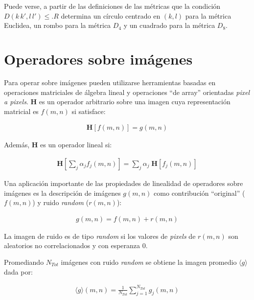 %
Puede verse, a partir de las definiciones de las m\'etricas que la condici\'on $D(k \, k', l \, l') \leq. R$ determina un c\'irculo centrado en $(k, l)$ 
para la m\'etrica Euclidea, un rombo para la m\'etrica $D_{4}$ y un cuadrado para la m\'etrica $D_{8}$.


\section{Operadores sobre im\'agenes}

Para operar sobre im\'agenes pueden utilizarse herramientas basadas en operaciones matriciales de \'algebra lineal y operaciones ``de array'' orientadas 
\textit{pixel a pixels}.
%
$\mathbf{H}$ es un operador arbitrario sobre una imagen cuya representaci\'on matricial es $f(m, n)$ si satisface:

\begin{eqnarray}
	\mathbf{H} \left[ f(m, n) \right] = g(m, n)
\label{EqXXXV}
\end{eqnarray}

Adem\'as, $\mathbf{H}$ es un operador lineal si:

\begin{eqnarray}
	\mathbf{H} \left[ \sum _{j} \alpha_{j} f_{j}(m, n) \right] = \sum _{j} \alpha_{j} \; \mathbf{H} \left[ f_{j}(m, n) \right]
\label{EqXXXVI}
\end{eqnarray}

Una aplicaci\'on importante de las propiedades de linealidad de operadores sobre im\'agenes es la descripci\'on de im\'agenes $g(m, n)$ como contribuci\'on 
``original'' ($f(m, n)$) y ruido \textit{random} ($r(m, n)$):

\begin{eqnarray}
	g(m, n) = f(m, n) + r(m, n)
\label{EqXXXVII}
\end{eqnarray}


La imagen de ruido es de tipo \textit{random} si los valores de \textit{pixels} de $r(m, n)$ son aleatorios no correlacionados y con esperanza 0.
%

%
Promediando $N_{Tot}$ im\'agenes con ruido \textit{random} se obtiene la imagen promedio $\langle g \rangle$ dada por:

\begin{eqnarray}
	\langle g \rangle (m, n) = \frac{1}{N_{Tot}} \sum _{j=1} ^{N_{Tot}} g_{j} (m, n) 
\label{EqXXXVIII}
\end{eqnarray}

